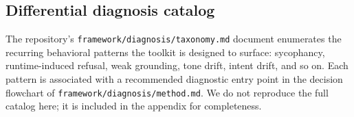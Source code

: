 \subsection{Differential diagnosis catalog}
\label{sec:taxonomy}

The repository's \texttt{framework/diagnosis/taxonomy.md} document enumerates the
recurring behavioral patterns the toolkit is designed to surface:
sycophancy, runtime-induced refusal, weak grounding, tone drift,
intent drift, and so on. Each pattern is associated with a recommended
diagnostic entry point in the decision flowchart of \texttt{framework/diagnosis/method.md}.
We do not reproduce the full catalog here; it is included in the
appendix for completeness.
